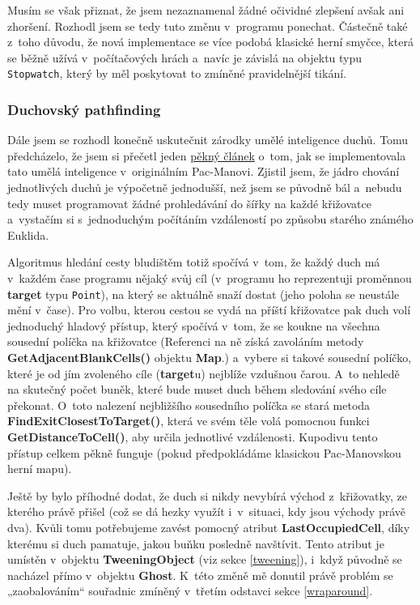 \documentclass{article}
\begin{document}
Musím se však přiznat, že jsem nezaznamenal žádné očividné zlepšení avšak ani zhoršení. Rozhodl jsem se tedy tuto změnu v~programu ponechat. Částečně také z~toho důvodu, že nová implementace se více podobá klasické herní smyčce, která se běžně užívá v~počítačových hrách a~navíc je závislá na objektu typu \verb|Stopwatch|, který by měl poskytovat to zmíněné pravidelnější tikání.

\subsubsection{Duchovský pathfinding} \label{ghostpathfinding}
Dále jsem se rozhodl konečně uskutečnit zárodky umělé inteligence duchů. Tomu předcházelo, že jsem si přečetl jeden \href{https://www.gamedeveloper.com/design/the-pac-man-dossier}{pěkný článek} o~tom, jak se implementovala tato umělá inteligence v~originálním Pac-Manovi. Zjistil jsem, že jádro chování jednotlivých duchů je výpočetně jednodušší, než jsem se původně bál a~nebudu tedy muset programovat žádné prohledávání do šířky na každé křižovatce a~vystačím si s~jednoduchým počítáním vzdáleností po způsobu starého známého Euklida. 

Algoritmus hledání cesty bludištěm totiž spočívá v~tom, že každý duch má v~každém čase programu nějaký svůj cíl (v~programu ho reprezentuji proměnnou \textbf{target} typu \verb|Point|), na který se aktuálně snaží dostat (jeho poloha se neustále mění v~čase). Pro volbu, kterou cestou se vydá na příští křižovatce pak duch volí jednoduchý hladový přístup, který spočívá v~tom, že se koukne na všechna sousední políčka na křižovatce (Referenci na ně získá zavoláním metody \textbf{GetAdjacentBlankCells()} objektu \textbf{Map}.) a~vybere si takové sousední políčko, které je od jím zvoleného cíle (\textbf{target}u) nejblíže vzdušnou čarou. A~to nehledě na skutečný počet buněk, které bude muset duch během sledování svého cíle překonat. O~toto nalezení nejbližšího sousedního políčka se stará metoda \textbf{FindExitClosestToTarget()}, která ve svém těle volá pomocnou funkci \textbf{GetDistanceToCell()}, aby určila jednotlivé vzdálenosti. Kupodivu tento přístup celkem pěkně funguje (pokud předpokládáme klasickou Pac-Manovskou herní mapu).

Ještě by bylo příhodné dodat, že duch si nikdy nevybírá východ z~křižovatky, ze kterého právě přišel (což se dá hezky využít i~v~situaci, kdy jsou východy právě dva). Kvůli tomu potřebujeme zavést pomocný atribut \textbf{LastOccupiedCell}, díky kterému si duch pamatuje, jakou buňku posledně navštívit. Tento atribut je umístěn v~objektu \textbf{TweeningObject} (viz sekce \ref{tweening}), i~když původně se nacházel přímo v~objektu \textbf{Ghost}. K~této změně mě donutil právě problém se „zaobalováním“ souřadnic zmíněný v~třetím odstavci sekce \ref{wraparound}.
\end{document}
